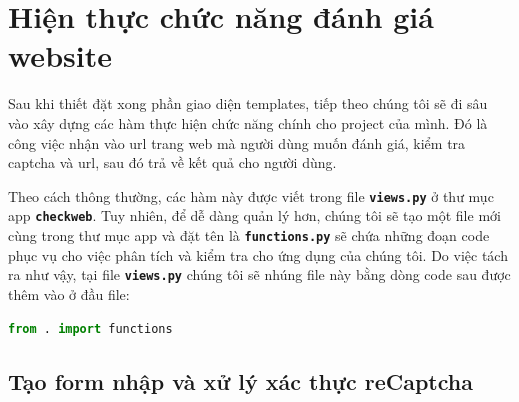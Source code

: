 \section{Hiện thực chức năng đánh giá website}
Sau khi thiết đặt xong phần giao diện templates, tiếp theo chúng tôi sẽ đi sâu vào xây dựng các hàm thực hiện chức năng chính cho project của mình. Đó là công việc nhận vào url trang web mà người dùng muốn đánh giá, kiểm tra captcha và url, sau đó trả về kết quả cho người dùng.
\par
Theo cách thông thường, các hàm này được viết trong file \textbf{\texttt{views.py}} ở thư mục app \textbf{\texttt{checkweb}}. Tuy nhiên, để dễ dàng quản lý hơn, chúng tôi sẽ tạo một file mới cùng trong thư mục app và đặt tên là \textbf{\texttt{functions.py}} sẽ chứa những đoạn code phục vụ cho việc phân tích và kiểm tra cho ứng dụng của chúng tôi. Do việc tách ra như vậy, tại file \textbf{\texttt{views.py}} chúng tôi sẽ nhúng file này bằng dòng code sau được thêm vào ở đầu file:
\begin{lstlisting}[language=Python]
from . import functions
\end{lstlisting}
\par
\subsection{Tạo form nhập và xử lý xác thực reCaptcha}
